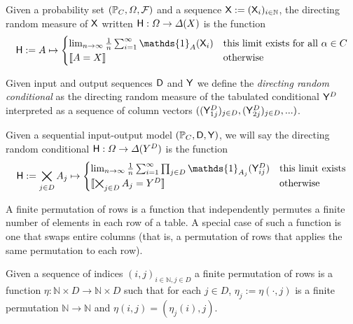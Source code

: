 \begin{definition}\label{def:dir_rand_meas}
Given a probability set $(\mathbb{P}_C,\Omega,\mathcal{F})$ and a sequence $\mathsf{X}:=(\mathsf{X}_i)_{i\in\mathbb{N}}$, the directing random measure of $\mathsf{X}$ written $\mathsf{H}:\Omega\to \Delta(X)$ is the function
\begin{align}
    \RV{H} := A \mapsto \begin{cases}
    \lim_{n\to \infty}\frac{1}{n} \sum_{i=1}^{\infty} \mathds{1}_{A}(\RV{X}_{i}) & \text{this limit exists for all }\alpha\in C\\
    \llbracket A = X \rrbracket &\text{otherwise}
    \end{cases} 
\end{align}
\end{definition}

Given input and output sequences $\mathsf{D}$ and $\mathsf{Y}$ we define the \emph{directing random conditional} as the directing random measure of the tabulated conditional $\mathsf{Y}^D$ interpreted as a sequence of column vectors $((\mathsf{Y}^D_{1j})_{j\in D},(\mathsf{Y}^D_{2j})_{j\in D},...)$.

\begin{definition}\label{def:dir_rand_cond}
Given a sequential input-output model $(\mathbb{P}_C,\mathsf{D},\mathsf{Y})$, we will say the directing random conditional $\mathsf{H}:\Omega\to \Delta(Y^D)$ is the function
\begin{align}
    \RV{H} := \bigtimes_{j\in D} A_j \mapsto \begin{cases}
    \lim_{n\to \infty}\frac{1}{n} \sum_{i=1}^{\infty} \prod_{j\in D} \mathds{1}_{A_j}(\RV{Y}^D_{ij}) & \text{this limit exists}\\
    \llbracket \bigtimes_{j\in D} A_j = Y^D \rrbracket &\text{otherwise}
    \end{cases} 
\end{align}
\end{definition}

A finite permutation of rows is a function that independently permutes a finite number of elements in each row of a table. A special case of such a function is one that swaps entire columns (that is, a permutation of rows that applies the same permutation to each row).

\begin{definition}
Given a sequence of indices $(i,j)_{i\in \mathbb{N},j\in D}$ a finite permutation of rows is a function $\eta:\mathbb{N}\times D\to \mathbb{N}\times D$ such that for each $j\in D$, $\eta_j:=\eta(\cdot,j)$ is a finite permutation $\mathbb{N}\to \mathbb{N}$ and $\eta(i,j)=(\eta_j(i),j)$.
\end{definition}

